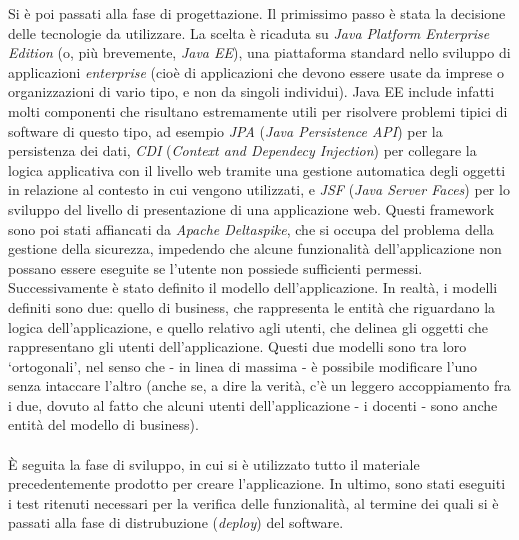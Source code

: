Si è poi passati alla fase di progettazione. Il primissimo passo è stata la decisione delle tecnologie da utilizzare. La scelta è ricaduta su \textsl{Java Platform Enterprise Edition} (o, più brevemente, \textsl{Java EE}), una piattaforma standard nello sviluppo di applicazioni \textit{enterprise} (cioè di applicazioni che devono essere usate da imprese o organizzazioni di vario tipo, e non da singoli individui). Java EE include infatti molti componenti che risultano estremamente utili per risolvere problemi tipici di software di questo tipo, ad esempio \textsl{JPA} (\textsl{Java Persistence API}) per la persistenza dei dati, \textsl{CDI} (\textsl{Context and Dependecy Injection}) per collegare la logica applicativa con il livello web tramite una gestione automatica degli oggetti in relazione al contesto in cui vengono utilizzati, e \textsl{JSF} (\textsl{Java Server Faces}) per lo sviluppo del livello di presentazione di una applicazione web. Questi framework sono poi stati affiancati da \textsl{Apache Deltaspike}, che si occupa del problema della gestione della sicurezza, impedendo che alcune funzionalità dell'applicazione non possano essere eseguite se l'utente non possiede sufficienti permessi.\\
Successivamente è stato definito il modello dell'applicazione. In realtà, i modelli definiti sono due: quello di business, che rappresenta le entità che riguardano la logica dell'applicazione, e quello relativo agli utenti, che delinea gli oggetti che rappresentano gli utenti dell'applicazione. Questi due modelli sono tra loro \textquoteleft ortogonali\textquoteright{}, nel senso che - in linea di massima - è possibile modificare l'uno senza intaccare l'altro (anche se, a dire la verità, c'è un leggero accoppiamento fra i due, dovuto al fatto che alcuni utenti dell'applicazione - i docenti - sono anche entità del modello di business).\\
\\

È seguita la fase di sviluppo, in cui si è utilizzato tutto il materiale precedentemente prodotto per creare l'applicazione. In ultimo, sono stati eseguiti i test ritenuti necessari per la verifica delle funzionalità, al termine dei quali si è passati alla fase di distrubuzione (\textit{deploy}) del software.\\
\\
